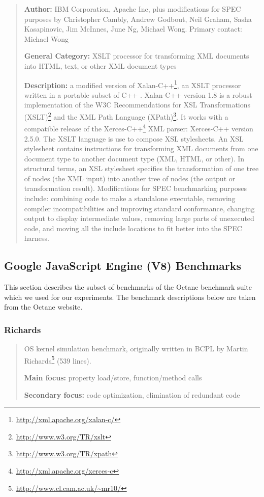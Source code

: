 \documentclass[onecolumn, openany, master, english, seal, signatures]{dbrgrptt}
\begin{document}
\begin{quote}
\textbf{Author:} IBM Corporation, Apache Inc, plus modifications for SPEC purposes by Christopher Cambly, Andrew Godbout, Neil Graham, Sasha Kasapinovic, Jim McInnes, June Ng, Michael Wong. Primary contact: Michael Wong

\textbf{General Category:} XSLT processor for transforming XML documents into HTML, text, or other XML document types

\textbf{Description:} a modified version of Xalan-C++\footnote{\url{http://xml.apache.org/xalan-c/}}, an XSLT processor written in a portable subset of C++ . Xalan-C++ version 1.8 is a robust implementation of the W3C Recommendations for XSL Transformations (XSLT)\footnote{\url{http://www.w3.org/TR/xslt}} and the XML Path Language (XPath)\footnote{\url{http://www.w3.org/TR/xpath}}. It works with a compatible release of the Xerces-C++\footnote{\url{http://xml.apache.org/xerces-c}} XML parser: Xerces-C++ version 2.5.0. The XSLT language is use to compose XSL stylesheets. An XSL stylesheet contains instructions for transforming XML documents from one document type to another document type (XML, HTML, or other). In structural terms, an XSL stylesheet specifies the transformation of one tree of nodes (the XML input) into another tree of nodes (the output or transformation result).
Modifications for SPEC benchmarking purposes include: combining code to make a standalone executable, removing compiler incompatibilities and improving standard conformance, changing output to display intermediate values, removing large parts of unexecuted code, and moving all the include locations to fit better into the SPEC harness.
\end{quote}

\subsection{Google JavaScript Engine (V8) Benchmarks}

This section describes the subset of benchmarks of the Octane benchmark suite \cite{v8benchmarks} which we used for our experiments. The benchmark descriptions below are taken from the Octane website.

\subsubsection{Richards}

\begin{quote}
OS kernel simulation benchmark, originally written in BCPL by Martin Richards\footnote{\url{http://www.cl.cam.ac.uk/~mr10/}} (539 lines).

\textbf{Main focus:} property load/store, function/method calls

\textbf{Secondary focus:} code optimization, elimination of redundant code
\end{quote}
\end{document}
